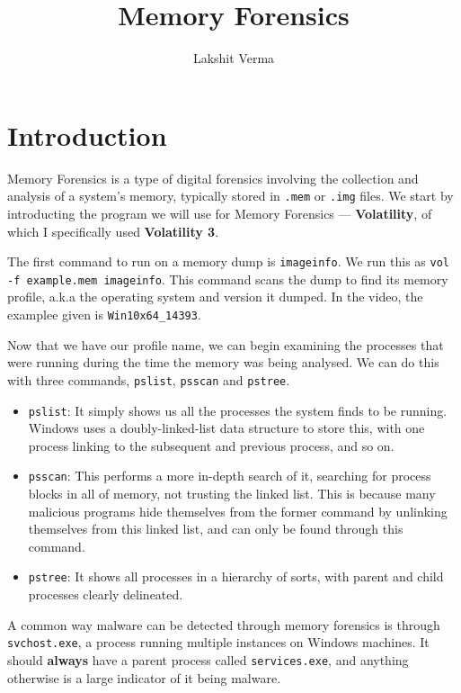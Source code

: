 \documentclass{article}
\title{Memory Forensics}
\author{Lakshit Verma}
\begin{document}
\maketitle
\tableofcontents
\newpage

\section{Introduction}

Memory Forensics is a type of digital forensics involving the collection and analysis of a system's memory, typically stored in \texttt{.mem} or \texttt{.img} files. We start by introducting the program we will use for Memory Forensics — \textbf{Volatility}, of which I specifically used \textbf{Volatility 3}.

The first command to run on a memory dump is \texttt{imageinfo}. We run this as \texttt{vol -f example.mem imageinfo}. This command scans the dump to find its memory profile, a.k.a the operating system and version it dumped. In the video, the examplee given is \texttt{Win10x64\_14393}.

Now that we have our profile name, we can begin examining the processes that were running during the time the memory was being analysed. We can do this with three commands, \texttt{pslist}, \texttt{psscan} and \texttt{pstree}.

\begin{itemize}
    \item{\texttt{pslist}: It simply shows us all the processes the system finds to be running. Windows uses a doubly-linked-list data structure to store this, with one process linking to the subsequent and previous process, and so on.}
    \item{\texttt{psscan}: This performs a more in-depth search of it, searching for process blocks in all of memory, not trusting the linked list. This is because many malicious programs hide themselves from the former command by unlinking themselves from this linked list, and can only be found through this command.}
    \item{\texttt{pstree}: It shows all processes in a hierarchy of sorts, with parent and child processes clearly delineated.}
\end{itemize}

A common way malware can be detected through memory forensics is through \texttt{svchost.exe}, a process running multiple instances on Windows machines. It should \textbf{always} have a parent process called \texttt{services.exe}, and anything otherwise is a large indicator of it being malware.
\end{document}
